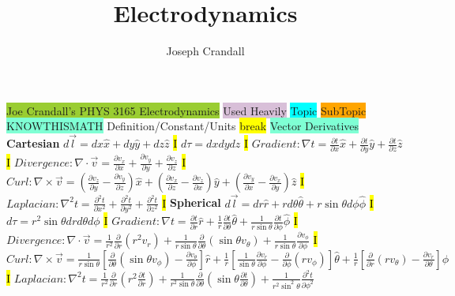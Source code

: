 \documentclass[fontsize=4pt]{scrartcl}
\title{Electrodynamics}
\author{Joseph Crandall}
\begin{document}

\colorbox{YellowGreen}{Joe Crandall's PHYS 3165 Electrodynamics}
\colorbox{Thistle}{Used Heavily}
\colorbox{Cyan}{Topic}
\colorbox{Orange}{SubTopic}
\colorbox{Aquamarine}{KNOWTHISMATH}
\colorbox{RubineRed}{Definition/Constant/Units}
\colorbox{Yellow}{break}
\colorbox{Aquamarine}{Vector Derivatives}
\textbf{Cartesian}
$d\vec{l} = dx\hat{x} + dy\hat{y} + dz\hat{z}$
\hl{I}
$d \tau = dxdydz$
\hl{I}
$Gradient:  \nabla t =\frac{\partial t}{\partial x}\hat{x} + \frac{\partial t}{\partial y}\hat{y} + \frac{\partial t}{\partial z}\hat{z} $
\hl{I}
$Divergence: \nabla \cdot \vec{v} = \frac{\partial v_x}{\partial x} + \frac{\partial v_y}{\partial y} + \frac{\partial v_z}{\partial z}$
\hl{I}
$Curl: \nabla \times \vec{v} = (\frac{\partial v_z}{\partial y} - \frac{\partial v_y}{\partial z}) \hat{x} + (\frac{\partial v_x}{\partial z} - \frac{\partial v_z}{\partial x}) \hat{y} + (\frac{\partial v_y}{\partial x}- \frac{\partial v_x}{\partial y})\hat{z}$
\hl{I}
$Laplacian: \nabla^2 t = \frac{\partial^2 t}{\partial x^2} + \frac{\partial^2 t}{\partial y^2} + \frac{\partial^2 t}{\partial z^2}$
\hl{I}
\textbf{Spherical}
$d\vec{l} = dr \hat{r} + rd\theta \hat{\theta} + r \sin \theta d\phi \hat{\phi} $
\hl{I}
$d\tau = r^2 \sin \theta dr d\theta d\phi$
\hl{I}
$Gradient: \nabla t = \frac{\partial t}{\partial r} \hat{r} + \frac{1}{r}\frac{\partial t}{\partial \theta} \hat{\theta} +\frac{1}{ r \sin \theta} \frac{\partial t}{\partial \phi}\hat{\phi}$ 
\hl{I}
$Divergence: \nabla \cdot \vec{v} = \frac{1}{r^2}\frac{\partial}{\partial r} (r^2 v_r) + \frac{1}{r\sin \theta} \frac{\partial }{\partial \theta }(\sin \theta v_{\theta}) + \frac{1}{r\sin \theta }\frac{\partial v_{\phi}}{\partial \phi}$
\hl{I}
$Curl: \nabla \times \vec{v} = \frac{1}{r \sin \theta} [\frac{\partial}{\partial \theta} (\sin\theta v_{\phi}) - \frac{\partial v_\theta}{\partial \phi}] \hat{r} +      \frac{1}{r} [\frac{1}{\sin \theta} \frac{\partial v_r}{\partial \phi} - \frac{\partial} {\partial \phi} (r v_{\phi})] \hat{\theta} + \frac{1}{r} [\frac{\partial}{\partial r} (r v_{\theta}) - \frac{\partial v_{r}} {\partial \theta}] \hat{\phi} $
\hl{I}
$Laplacian: \nabla^2 t = \frac{1}{r^2}\frac{\partial}{\partial r}(r^2\frac{\partial t}{\partial r}) + \frac{1}{r^2 \sin \theta} \frac{\partial}{\partial \theta}(\sin \theta \frac{\partial t}{\partial \theta}) + \frac{1}{r^2 \sin^2\theta}\frac{\partial^2 t}{\partial \phi^2}$
\end{document}
